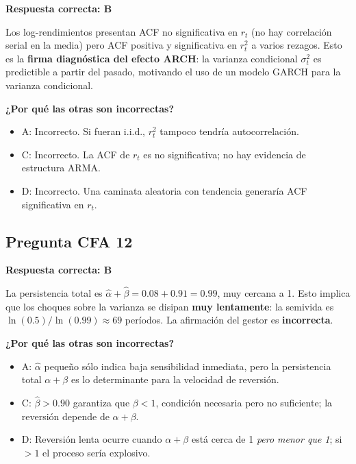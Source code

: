 \documentclass[12pt,a4paper]{article}
\begin{document}
\begin{respuestacfa}
\textbf{Respuesta correcta: B}

Los log-rendimientos presentan ACF no significativa en $r_t$ (no hay correlación serial en la media) pero ACF positiva y significativa en $r_t^2$ a varios rezagos. Esto es la \textbf{firma diagnóstica del efecto ARCH}: la varianza condicional $\sigma_t^2$ es predictible a partir del pasado, motivando el uso de un modelo GARCH para la varianza condicional.

\textbf{¿Por qué las otras son incorrectas?}
\begin{itemize}[noitemsep]
  \item A: Incorrecto. Si fueran i.i.d., $r_t^2$ tampoco tendría autocorrelación.
  \item C: Incorrecto. La ACF de $r_t$ es no significativa; no hay evidencia de estructura ARMA.
  \item D: Incorrecto. Una caminata aleatoria con tendencia generaría ACF significativa en $r_t$.
\end{itemize}
\end{respuestacfa}

\subsection*{Pregunta CFA 12}

\begin{respuestacfa}
\textbf{Respuesta correcta: B}

La persistencia total es $\hat{\alpha}+\hat{\beta}=0.08+0.91=0.99$, muy cercana a 1. Esto implica que los choques sobre la varianza se disipan \textbf{muy lentamente}: la semivida es $\ln(0.5)/\ln(0.99)\approx69$ períodos. La afirmación del gestor es \textbf{incorrecta}.

\textbf{¿Por qué las otras son incorrectas?}
\begin{itemize}[noitemsep]
  \item A: $\hat{\alpha}$ pequeño sólo indica baja sensibilidad inmediata, pero la persistencia total $\alpha+\beta$ es lo determinante para la velocidad de reversión.
  \item C: $\hat{\beta}>0.90$ garantiza que $\beta<1$, condición necesaria pero no suficiente; la reversión depende de $\alpha+\beta$.
  \item D: Reversión lenta ocurre cuando $\alpha+\beta$ está cerca de 1 \emph{pero menor que 1}; si $>1$ el proceso sería explosivo.
\end{itemize}
\end{respuestacfa}
\end{document}
